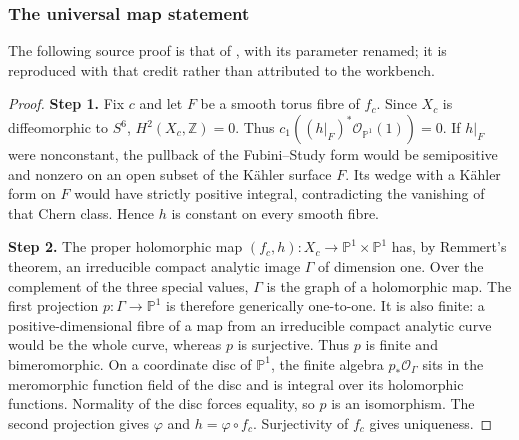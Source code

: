 \subsubsection{The universal map statement}
The following source proof is that of \cite[Theorem 7.2]{DGKXv1}, with its parameter renamed; it is reproduced with that credit rather than attributed to the workbench.
\begin{proof}
\par\smallskip\noindent\textbf{Step 1.} Fix $c$ and let $F$ be a smooth torus fibre of $f_c$. Since $X_c$ is
diffeomorphic to $S^6$, $H^2(X_c,\mathbb Z)=0$. Thus
$c_1((h|_F)^*\mathcal O_{\mathbb P^1}(1))=0$. If $h|_F$ were nonconstant, the
pullback of the Fubini--Study form would be semipositive and nonzero
on an open subset of the K\"ahler surface $F$. Its wedge with a
K\"ahler form on $F$ would have strictly positive integral,
contradicting the vanishing of that Chern class. Hence $h$ is
constant on every smooth fibre.

\par\smallskip\noindent\textbf{Step 2.} The proper holomorphic map $(f_c,h):X_c\to\mathbb P^1\times\mathbb P^1$ has,
by Remmert's theorem, an irreducible compact analytic image $\Gamma$
of dimension one. Over the complement of the three special values,
$\Gamma$ is the graph of a holomorphic map. The first projection
$p:\Gamma\to\mathbb P^1$ is therefore generically one-to-one. It is also
finite: a positive-dimensional fibre of a map from an irreducible
compact analytic curve would be the whole curve, whereas $p$ is
surjective. Thus $p$ is finite and bimeromorphic. On a coordinate
disc of $\mathbb P^1$, the finite algebra $p_*\mathcal O_\Gamma$ sits in the
meromorphic function field of the disc and is integral over its
holomorphic functions. Normality of the disc forces equality, so
$p$ is an isomorphism. The second projection gives $\varphi$ and
$h=\varphi\circ f_c$. Surjectivity of $f_c$ gives uniqueness.
\end{proof}
